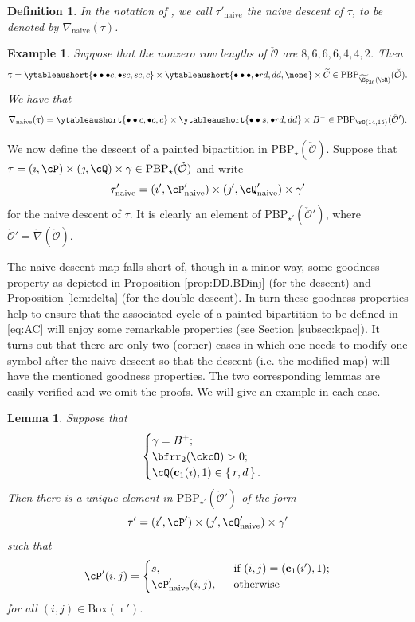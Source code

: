 \documentclass[11pt,a4paper]{amsart}
\newcommand{\CO}{{\mathcal {O}}}
\def\DD{\nabla}
\numberwithin{equation}{section}
\newtheorem{lem}[thm]{Lemma}
\newtheorem{defn}[thm]{Definition}
\newtheorem{eg}[thm]{Example}
\theoremstyle{remark}
\def\DDn{\DD_{\mathrm{naive}}}
\let\ytb=\ytableaushort
\def\BOX{\mathrm{Box}}
\def\PBP{\mathrm{PBP}}
\begin{document}
 
 \begin{defn}
 In the notation of  , 
 we call $\tau'_\mathrm{naive}$ the naive descent of $\tau$, to be denoted by $\DDn(\tau)$.
 \end{defn}
 

\begin{eg}  
 Suppose that the nonzero row lengths of $\check \CO$ are $8,6,6,6,4,4,2$. Then 
    \[
     \uptau = \ytb{\bullet\bullet\bullet {c},\bullet {s} {c},{s} {c},{c}}
    \times \ytb{\bullet\bullet\bullet ,\bullet {r} {d},{d}{d}, \none}
    \times \widetilde C \in \PBP_{\widetilde{\Sp}_{36}(\bR)}(\check \CO).     
    \]
  We have that  
   \[
    \nabla_{\mathrm{naive}}(\uptau) =\ytb{\bullet\bullet{c} ,\bullet{c},{c} }
    \times  \ytb{\bullet\bullet {s} ,\bullet {r} {d},{d}{d}}\times B^- \in \PBP_{\rO(14,15)}(\check \CO').
    \]
\end{eg}


We now define the descent of a painted bipartition in $\mathrm{PBP}_\star(\check \CO)$. 
Suppose that
$
\tau=(\imath,\cP)\times(\jmath,\cQ)\times \gamma \in  \mathrm{PBP}_\star(\check \CO)
$
and write
\[
  \tau'_{\mathrm{naive}}=(\imath', \cP'_{\mathrm{naive}})\times (\jmath', \cQ'_{\mathrm{naive}})\times \gamma '
\]
for the naive descent of $\tau$. It is clearly an element of $  \mathrm{PBP}_{\star'}(\check \CO')$, where $\check \CO'=\check \nabla(\check \CO)$. 

The naive descent map falls short of, though in a minor way, some goodness property as depicted in Proposition \ref{prop:DD.BDinj} (for the descent) and Proposition \ref{lem:delta} (for the double descent). In turn these goodness properties help to ensure that the associated cycle of a painted bipartition to be defined in \eqref{eq:AC} will enjoy some remarkable properties (see Section \ref{subsec:kpac}).  It turns out that there are only two (corner) cases in which one needs to modify one symbol after the naive descent so that the descent (i.e. the modified map) will have the mentioned goodness properties. The two corresponding lemmas are easily verified and we omit the proofs. We will give an example in each case.


\begin{lem}\label{descb1}
  Suppose that
\[  \begin{cases}
 \gamma = B^+; & \\
 \bfrr_2(\ckcO)>0; & \\
 \cQ(\mathbf c_1(\imath),1)\in \set{r,d}.
\end{cases}
\]
 Then there is a unique element in $\mathrm{PBP}_{\star'}(\check \CO')$ of the form
  \[
      \tau'=(\imath', \cP')\times (\jmath', \cQ'_{\mathrm{naive}} )\times \gamma '
  \]
 such that
\[
\cP'(i,j) = \begin{cases}
  s, & \ \text{ if $(i,j) = (\mathbf c_1(\imath'),1)$;}\\
  \cP'_{\mathrm{naive}}(i,j), & \ \text{ otherwise}
  \end{cases}
  \]
 for all $(i,j)\in \BOX(\imath')$.
\end{lem}
\end{document}
